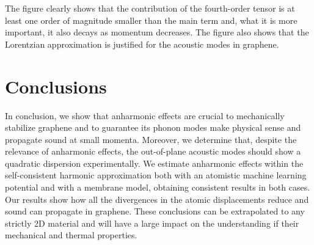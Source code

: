 The figure clearly shows that the contribution of the fourth-order tensor is at least one order of magnitude smaller 
than the main term and, what it is more important, it also decays as momentum decreases. The figure also shows that 
the Lorentzian approximation is justified for the acoustic modes in graphene.

\section{Conclusions}

In conclusion, we show that anharmonic effects are crucial to mechanically stabilize graphene and to guarantee its 
phonon modes make physical sense and propagate sound at small momenta. Moreover, we determine that, despite the 
relevance of anharmonic effects, the out-of-plane acoustic modes should show a quadratic dispersion experimentally. 
We estimate anharmonic effects within the self-consistent harmonic approximation both with an atomistic machine 
learning potential and with a membrane model, obtaining consistent results in both cases. Our results show how all 
the divergences in the atomic displacements reduce and sound can propagate in graphene. These conclusions can 
be extrapolated to any strictly 2D material and will have a large impact on the understanding if their mechanical 
and thermal properties.
